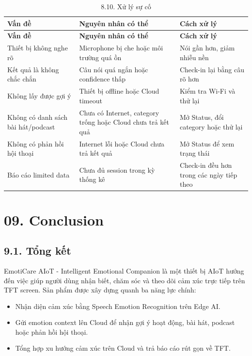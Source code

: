 \documentclass[12pt,a4paper]{article}
\begin{document}
\begin{center}
\begin{longtable}{|P{0.25\textwidth}|P{0.32\textwidth}|P{0.33\textwidth}|}
\caption{8.10. Xử lý sự cố}\\
\hline
\textbf{Vấn đề} & \textbf{Nguyên nhân có thể} & \textbf{Cách xử lý} \\
\hline
\endfirsthead
\hline
\textbf{Vấn đề} & \textbf{Nguyên nhân có thể} & \textbf{Cách xử lý} \\
\hline
\endhead
Thiết bị không nghe rõ & Microphone bị che hoặc môi trường quá ồn & Nói gần hơn, giảm nhiễu nền \\
\hline
Kết quả là không chắc chắn & Câu nói quá ngắn hoặc confidence thấp & Check-in lại bằng câu rõ hơn \\
\hline
Không lấy được gợi ý & Thiết bị offline hoặc Cloud timeout & Kiểm tra Wi-Fi và thử lại \\
\hline
Không có danh sách bài hát/podcast & Chưa có Internet, category trống hoặc Cloud chưa trả kết quả & Mở Status, đổi category hoặc thử lại \\
\hline
Không có phản hồi hội thoại & Internet lỗi hoặc Cloud chưa trả kết quả & Mở Status để xem trạng thái \\
\hline
Báo cáo limited data & Chưa đủ session trong kỳ thống kê & Check-in đều hơn trong các ngày tiếp theo \\
\hline
\end{longtable}
\end{center}

\FloatBarrier

\clearpage
\section*{09. Conclusion}

\subsection*{9.1. Tổng kết}

EmotiCare AIoT - Intelligent Emotional Companion là một thiết bị AIoT hướng đến việc giúp người dùng nhận biết, chăm sóc và theo dõi cảm xúc trực tiếp trên TFT screen. Sản phẩm được xây dựng quanh ba năng lực chính:


\begin{itemize}
\item Nhận diện cảm xúc bằng Speech Emotion Recognition trên Edge AI.
\item Gửi emotion context lên Cloud để nhận gợi ý hoạt động, bài hát, podcast hoặc phản hồi hội thoại.
\item Tổng hợp xu hướng cảm xúc trên Cloud và trả báo cáo rút gọn về TFT.
\end{itemize}
\end{document}
